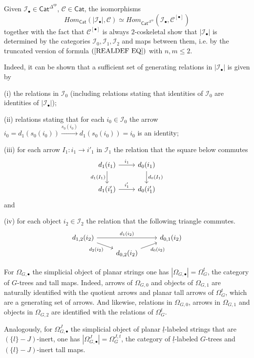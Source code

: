 \documentclass[a4paper,10pt]{article}%
\begin{document}
\begin{remark}
	Given $\mathcal{I}_{\bullet} \in \mathsf{Cat}^{\Delta^{op}}$, $\mathcal{C} \in \mathsf{Cat}$, the isomorphisms
	\[
	Hom_{\mathsf{Cat}}(|\mathcal{I}_{\bullet}|,\mathcal{C})
		\simeq
	Hom_{\mathsf{Cat}^{\Delta^{op}}}(\mathcal{I}_{\bullet},\mathcal{C}^{[\bullet]})
	\]
	together with the fact that $\mathcal{C}^{[\bullet]}$ is always $2$-coskeletal show that $|\mathcal{I}_{\bullet}|$
	is determined by the categories 
	$\mathcal{I}_0,\mathcal{I}_1,\mathcal{I}_2$
	and maps between them, i.e. by the truncated version of
	formula $(\ref{REALDEF EQ})$ with $n,m \leq 2$.

Indeed, it can be shown that a sufficient set of generating relations in $|\mathcal{I}_{\bullet}|$ is given by
\begin{inparaenum}
\item[(i)]
 the relations in $\mathcal{I}_0$
(including relations stating that identities of  
$\mathcal{I}_0$ are identities of $|\mathcal{I}_{\bullet}|$);
\item[(ii)] relations stating that for each $i_0 \in \mathcal{I}_0$ the arrow 
$i_0 = d_1(s_0(i_0)) \xrightarrow{s_0(i_0)} d_1(s_0(i_0)) = i_0$
is an identity;
\item[(iii)] for each arrow $I_1\colon i_1 \to i'_1$ in $\mathcal{I}_1$ the relation that the square below commutes
\[
\begin{tikzcd}
	d_1(i_1) \ar{r}{i_1} \ar{d}[swap]{d_1(I_1)} & 
	d_0(i_1) \ar{d}{d_0(I_1)}
\\
	d_1(i'_1) \ar{r}{i'_1} &
	d_0(i'_1)
\end{tikzcd}
\]
and
\item[(iv)] for each object $i_2 \in \mathcal{I}_2$ the relation that the following triangle commutes.
\[
\begin{tikzcd}[row sep = 0.5em]
	d_{1,2}(i_2) \ar{rr}{d_1(i_2)} \ar{rd}[swap]{d_2(i_2)} & & d_{0,1}(i_2) \\
	& d_{0,2}(i_2) \ar{ru}[swap]{d_0(i_2)}
\end{tikzcd}
\]
\end{inparaenum}
\end{remark}


\begin{example}\label{PLANARSTRING EX}
For $\Omega_{G,\bullet}$ the simplicial object of planar strings one has $|\Omega_{G,\bullet}| = \Omega_G^t$, the category of $G$-trees and tall maps. Indeed, arrows of $\Omega_{G,0}$ and objects of $\Omega_{G,1}$ are naturally identified with the quotient arrows and planar tall arrows of $\Omega_G^t$, which are a generating set of arrows.
And likewise, relations in $\Omega_{G,0}$, 
arrows in $\Omega_{G,1}$ and 
objects in $\Omega_{G,2}$ are identified with the relations of $\Omega_G^t$.

Analogously, for $\Omega_{G,\bullet}^J$ the simplicial object of planar $\underline{l}$-labeled strings that are 
$(\{l\}-J)$-inert, one has $|\Omega_{G,\bullet}^J| = \Omega_G^{J,t}$,
the category of $\underline{l}$-labeled $G$-trees and $(\{l\}-J)$-inert tall maps.
\end{example}
\end{document}
